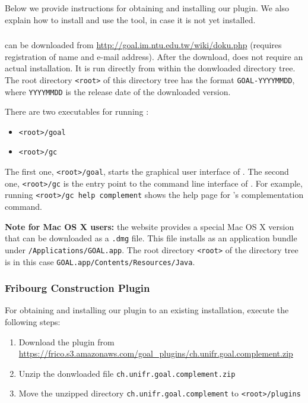 
Below we provide instructions for obtaining and installing our plugin. We also explain how to install and use the \goal{} tool, in case it is not yet installed.

\subsubsection{\goal}
\goal{} can be downloaded from \url{http://goal.im.ntu.edu.tw/wiki/doku.php} (requires registration of name and e-mail address). After the download, \goal{} does not require an actual installation. It is run directly from within the donwloaded directory tree. The root directory \texttt{<root>} of this directory tree has the format \texttt{GOAL-YYYYMMDD}, where \texttt{YYYYMMDD} is the release date of the downloaded \goal{} version.

There are two executables for running \goal:

\begin{itemize}
\item \texttt{<root>/goal}
\item \texttt{<root>/gc}
\end{itemize}

The first one, \texttt{<root>/goal}, starts the graphical user interface of \goal. The second one, \texttt{<root>/gc} is the entry point to the command line interface of \goal. For example, running \texttt{<root>/gc help complement} shows the help page for \goal's complementation command.

\textbf{Note for Mac OS X users:} the \goal{} website provides a special Mac OS X version that can be downloaded as a \texttt{.dmg} file. This file installs \goal{} as an application bundle under \texttt{/Applications/GOAL.app}. The root directory \texttt{<root>} of the \goal{} directory tree is in this case \texttt{GOAL.app/Contents/Resources/Java}.


\subsubsection{Fribourg Construction Plugin}

For obtaining and installing our plugin to an existing \goal{} installation, execute the following steps:

\begin{enumerate}
\item Download the plugin from \url{https://frico.s3.amazonaws.com/goal_plugins/ch.unifr.goal.complement.zip}
\item Unzip the donwloaded file \texttt{ch.unifr.goal.complement.zip}
\item Move the unzipped directory \texttt{ch.unifr.goal.complement} to \texttt{<root>/plugins}
\end{enumerate}

